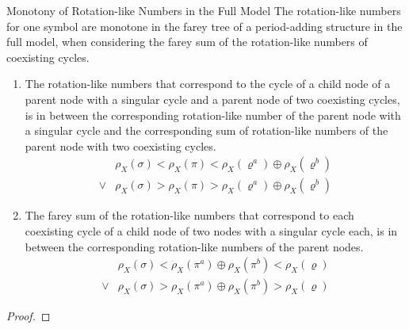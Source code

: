 \begin{theorem}{Monotony of Rotation-like Numbers in the Full Model}
    The rotation-like numbers for one symbol are monotone in the farey tree of a period-adding structure in the full model, when considering the farey sum of the rotation-like numbers of coexisting cycles.
    \begin{enumerate}
        \item The rotation-like numbers that correspond to the cycle of a child node of a parent node with a singular cycle and a parent node of two coexisting cycles, is in between the corresponding rotation-like number of the parent node with a singular cycle and the corresponding sum of rotation-like numbers of the parent node with two coexisting cycles.
              \begin{align*}
                       & \rho_X(\sigma) < \rho_X(\pi) < \rho_X(\varrho^a) \oplus \rho_X(\varrho^b) \\
                  \lor & \rho_X(\sigma) > \rho_X(\pi) > \rho_X(\varrho^a) \oplus \rho_X(\varrho^b)
              \end{align*}
        \item The farey sum of the rotation-like numbers that correspond to each coexisting cycle of a child node of two nodes with a singular cycle each, is in between the corresponding rotation-like numbers of the parent nodes.
              \begin{align*}
                       & \rho_X(\sigma) < \rho_X(\pi^a) \oplus \rho_X(\pi^b) < \rho_X(\varrho) \\
                  \lor & \rho_X(\sigma) > \rho_X(\pi^a) \oplus \rho_X(\pi^b) > \rho_X(\varrho)
              \end{align*}
    \end{enumerate}
\end{theorem}

\begin{proof}
\end{proof}